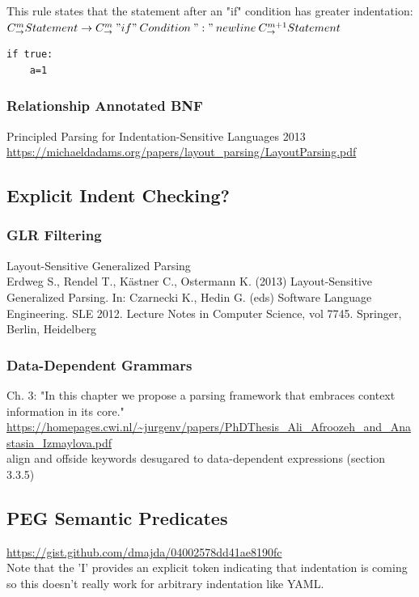 \documentclass{book}
\begin{document}
This rule states that the statement after an
"if" condition has greater indentation:\\
$C_\rightarrow^m Statement \rightarrow C_\rightarrow^m \: "if" \: Condition \: ":" \: newline \: C_\rightarrow^{m+1} Statement$

\begin{verbatim}
if true:
    a=1
\end{verbatim}


\subsubsection{Relationship Annotated BNF}
Principled Parsing for Indentation-Sensitive Languages 2013\\
\url{https://michaeldadams.org/papers/layout_parsing/LayoutParsing.pdf}



\subsection{Explicit Indent Checking?}

\subsubsection{GLR Filtering}
Layout-Sensitive Generalized Parsing\\
Erdweg S., Rendel T., Kästner C., Ostermann K. (2013) Layout-Sensitive Generalized Parsing. In: Czarnecki K., Hedin G. (eds) Software Language Engineering. SLE 2012. Lecture Notes in Computer Science, vol 7745. Springer, Berlin, Heidelberg

\subsubsection{Data-Dependent Grammars}
Ch. 3: "In this chapter we propose a parsing framework that embraces context information in its core."\\
\url{https://homepages.cwi.nl/~jurgenv/papers/PhDThesis_Ali_Afroozeh_and_Anastasia_Izmaylova.pdf}\\
align and offside keywords desugared to data-dependent expressions (section 3.3.5)

\subsection{PEG Semantic Predicates}
\url{https://gist.github.com/dmajda/04002578dd41ae8190fc}\\
Note that the 'I' provides an explicit token indicating that indentation is coming so this doesn't really work
for arbitrary indentation like YAML.
\end{document}
